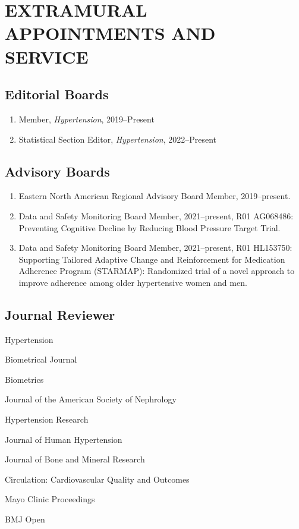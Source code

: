 \documentclass[11pt]{cv_wakeforest_article}
\newcommand{\AR}[1]{#1}  %
\newcommand{\mysection}[1]{\section*{#1}}
\newcommand{\mysubsection}[1]{\subsection*{#1}}
\newenvironment{packed_enum}{
\begin{enumerate}
  \setlength{\itemsep}{1pt}
  \setlength{\parskip}{0pt}
  \setlength{\parsep}{0pt}
}{\end{enumerate}}
\begin{document}
\mysection{EXTRAMURAL APPOINTMENTS AND SERVICE}

\markboth{\ }{\ }

\mysubsection{Editorial Boards}

\begin{enumerate}

\item Member, \textit{Hypertension}, 2019--Present

\item \AR{Statistical Section Editor, \textit{Hypertension}}, 2022--Present

\end{enumerate}

\mysubsection{Advisory Boards}

\begin{enumerate}

\item Eastern North American Regional Advisory Board Member, 2019--present.

\item \AR{Data and Safety Monitoring Board Member, 2021--present, R01 AG068486: Preventing Cognitive Decline by Reducing Blood Pressure Target Trial.}

\item \AR{Data and Safety Monitoring Board Member, 2021--present, R01 HL153750: Supporting Tailored Adaptive Change and Reinforcement for Medication Adherence Program (STARMAP): Randomized trial of a novel approach to improve adherence among older hypertensive women and men.}

\end{enumerate}

\mysubsection{Journal Reviewer}
\begin{packed_enum}
\item Hypertension
\item Biometrical Journal
\item Biometrics
\item Journal of the American Society of Nephrology
\item Hypertension Research
\item Journal of Human Hypertension
\item Journal of Bone and Mineral Research
\item Circulation: Cardiovascular Quality and Outcomes
\item Mayo Clinic Proceedings
\item BMJ Open
\end{packed_enum}
\end{document}
